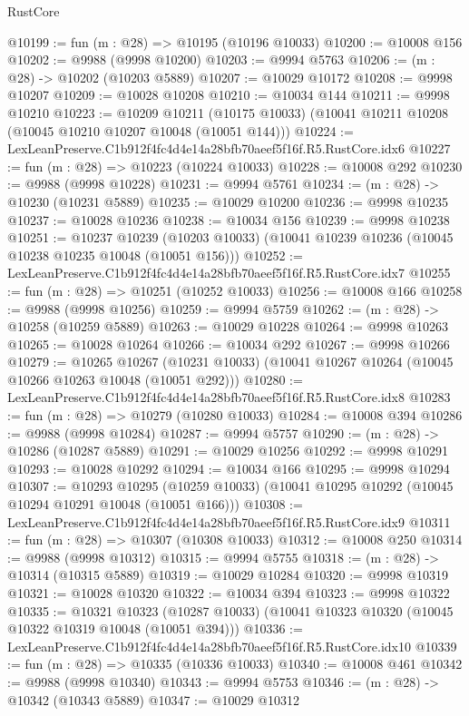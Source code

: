 \begin{lexlean}{RustCore}
\begin{coremodule}
@10199 := fun (m : @28) => @10195 (@10196 @10033)
@10200 := @10008 @156
@10202 := @9988 (@9998 @10200)
@10203 := @9994 @5763
@10206 := (m : @28) -> @10202 (@10203 @5889)
@10207 := @10029 @10172
@10208 := @9998 @10207
@10209 := @10028 @10208
@10210 := @10034 @144
@10211 := @9998 @10210
@10223 := @10209
    @10211
    (@10175 @10033)
    (@10041 @10211 @10208 (@10045 @10210 @10207 @10048 (@10051 @144)))
@10224 := LexLeanPreserve.C1b912f4fc4d4e14a28bfb70aeef5f16f.R5.RustCore.idx6
@10227 := fun (m : @28) => @10223 (@10224 @10033)
@10228 := @10008 @292
@10230 := @9988 (@9998 @10228)
@10231 := @9994 @5761
@10234 := (m : @28) -> @10230 (@10231 @5889)
@10235 := @10029 @10200
@10236 := @9998 @10235
@10237 := @10028 @10236
@10238 := @10034 @156
@10239 := @9998 @10238
@10251 := @10237
    @10239
    (@10203 @10033)
    (@10041 @10239 @10236 (@10045 @10238 @10235 @10048 (@10051 @156)))
@10252 := LexLeanPreserve.C1b912f4fc4d4e14a28bfb70aeef5f16f.R5.RustCore.idx7
@10255 := fun (m : @28) => @10251 (@10252 @10033)
@10256 := @10008 @166
@10258 := @9988 (@9998 @10256)
@10259 := @9994 @5759
@10262 := (m : @28) -> @10258 (@10259 @5889)
@10263 := @10029 @10228
@10264 := @9998 @10263
@10265 := @10028 @10264
@10266 := @10034 @292
@10267 := @9998 @10266
@10279 := @10265
    @10267
    (@10231 @10033)
    (@10041 @10267 @10264 (@10045 @10266 @10263 @10048 (@10051 @292)))
@10280 := LexLeanPreserve.C1b912f4fc4d4e14a28bfb70aeef5f16f.R5.RustCore.idx8
@10283 := fun (m : @28) => @10279 (@10280 @10033)
@10284 := @10008 @394
@10286 := @9988 (@9998 @10284)
@10287 := @9994 @5757
@10290 := (m : @28) -> @10286 (@10287 @5889)
@10291 := @10029 @10256
@10292 := @9998 @10291
@10293 := @10028 @10292
@10294 := @10034 @166
@10295 := @9998 @10294
@10307 := @10293
    @10295
    (@10259 @10033)
    (@10041 @10295 @10292 (@10045 @10294 @10291 @10048 (@10051 @166)))
@10308 := LexLeanPreserve.C1b912f4fc4d4e14a28bfb70aeef5f16f.R5.RustCore.idx9
@10311 := fun (m : @28) => @10307 (@10308 @10033)
@10312 := @10008 @250
@10314 := @9988 (@9998 @10312)
@10315 := @9994 @5755
@10318 := (m : @28) -> @10314 (@10315 @5889)
@10319 := @10029 @10284
@10320 := @9998 @10319
@10321 := @10028 @10320
@10322 := @10034 @394
@10323 := @9998 @10322
@10335 := @10321
    @10323
    (@10287 @10033)
    (@10041 @10323 @10320 (@10045 @10322 @10319 @10048 (@10051 @394)))
@10336 := LexLeanPreserve.C1b912f4fc4d4e14a28bfb70aeef5f16f.R5.RustCore.idx10
@10339 := fun (m : @28) => @10335 (@10336 @10033)
@10340 := @10008 @461
@10342 := @9988 (@9998 @10340)
@10343 := @9994 @5753
@10346 := (m : @28) -> @10342 (@10343 @5889)
@10347 := @10029 @10312

\end{coremodule}
\end{lexlean}

